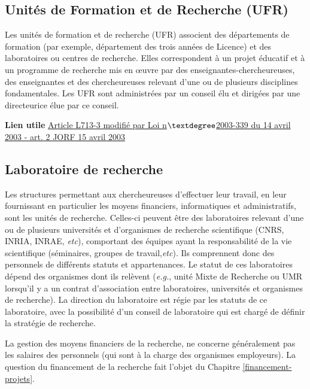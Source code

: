 \subsection{Unit\'es de Formation et de Recherche (UFR)}
Les unit\'es de formation et de recherche (UFR) associent des d\'epartements de formation (par exemple, d\'epartement des trois ann\'ees de Licence) et des laboratoires ou centres de recherche. Elles correspondent \`a un projet \'educatif et \`a un programme de recherche mis en \oe uvre par des enseignant\mp e\mp s-chercheur\mp euse\mp s, des enseignant\mp e\mp s et des chercheur\mp euse\mp s relevant d'une ou de plusieurs disciplines fondamentales. Les UFR sont administr\'ees par un conseil \'elu et dirig\'ees par un\mp e directeur\mp ice \'elu\mp e par ce conseil.

\textbf{Lien utile\hspace{.5em}}
\href{https://www.legifrance.gouv.fr/codes/id/LEGISCTA000006182444}{Article L713-3 modifi\'e par Loi n$\textdegree$2003-339 du 14 avril 2003 - art. 2 JORF 15 avril 2003}

\subsection{Laboratoire de recherche}
Les structures permettant aux chercheur\mp euse\mp s d'effectuer leur travail, en leur fournissant en particulier les moyens financiers, informatiques et administratifs, sont les unit\'es de recherche. Celles-ci peuvent \^etre des laboratoires relevant d'une ou de plusieurs universit\'es et d'organismes de recherche scientifique (CNRS, INRIA, INRAE, {\em etc}), comportant des \'equipes ayant la responsabilit\'e de la vie scientifique (s\'eminaires, groupes de travail,{\em etc}). Ils comprennent donc des personnels de diff\'erents statuts et appartenances. Le statut de ces laboratoires d\'epend des organismes dont ils rel\`event ({\em e.g.}, unit\'e Mixte de Recherche ou UMR lorsqu'il y a un contrat d'association entre laboratoires, universit\'es et organismes de recherche). La direction du laboratoire est r\'egie par les statuts de ce laboratoire, avec la possibilit\'e d'un conseil de laboratoire qui est charg\'e de d\'efinir la strat\'egie de recherche.

La gestion des moyens financiers de la recherche, ne concerne g\'en\'eralement pas les salaires des personnels (qui sont \`a la charge des organismes employeurs). La question du financement de la recherche fait l'objet du Chapitre \ref{financement-projets}. 


